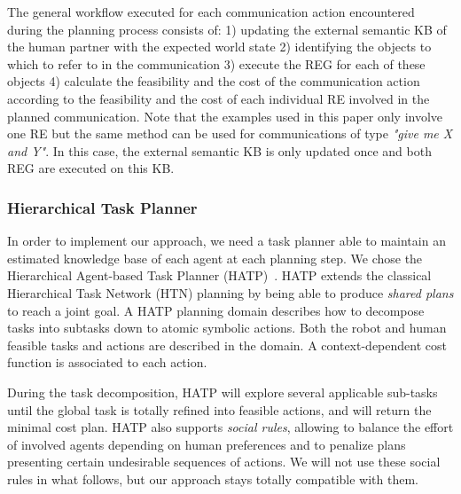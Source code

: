 \documentclass[a4paper,11pt,twoside]{StyleThese}
\begin{document}
The general workflow executed for each communication action encountered during the planning process consists of: 1) updating the external semantic KB of the human partner with the expected world state 2) identifying the objects to which to refer to in the communication 3) execute the REG for each of these objects 4) calculate the feasibility and the cost of the communication action according to the feasibility and the cost of each individual RE involved in the planned communication. Note that the examples used in this paper only involve one RE but the same method can be used for communications of type \textit{"give me X and Y"}. In this case, the external semantic KB is only updated once and both REG are executed on this KB.

\subsubsection{Hierarchical Task Planner}

In order to implement our approach, we need a task planner able to maintain an estimated knowledge base of each agent at each planning step. We chose the Hierarchical Agent-based Task Planner (HATP)~\cite{lallement2014hatp}. HATP extends the classical Hierarchical Task Network (HTN) planning by being able to produce \textit{shared plans} to reach a joint goal. A HATP planning domain describes how to decompose tasks into subtasks down to atomic symbolic actions. Both the robot and human feasible tasks and actions are described in the domain. A context-dependent cost function is associated to each action. 

During the task decomposition, HATP will explore several applicable sub-tasks until the global task is totally refined into feasible actions, and will return the minimal cost plan. HATP also supports \textit{social rules}, allowing to balance the effort of involved agents depending on human preferences and to penalize plans presenting certain undesirable sequences of actions. We will not use these social rules in what follows, but our approach stays totally compatible with them.
\end{document}
